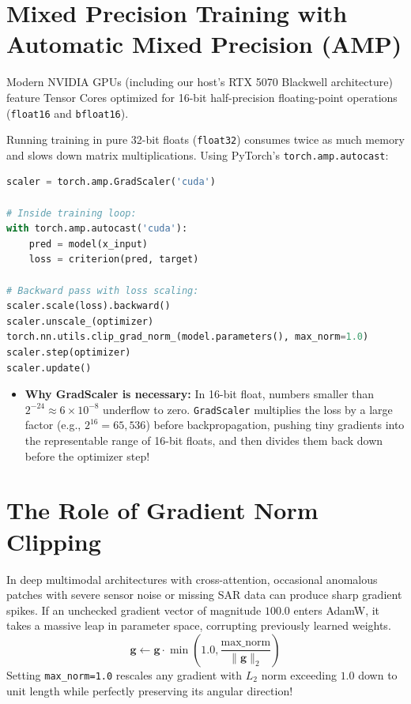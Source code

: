 \section{Mixed Precision Training with Automatic Mixed Precision (AMP)}
Modern NVIDIA GPUs (including our host's RTX 5070 Blackwell architecture) feature Tensor Cores optimized for 16-bit half-precision floating-point operations (\texttt{float16} and \texttt{bfloat16}).

Running training in pure 32-bit floats (\texttt{float32}) consumes twice as much memory and slows down matrix multiplications. Using PyTorch's \texttt{torch.amp.autocast}:
\begin{lstlisting}[language=Python]
scaler = torch.amp.GradScaler('cuda')

# Inside training loop:
with torch.amp.autocast('cuda'):
    pred = model(x_input)
    loss = criterion(pred, target)

# Backward pass with loss scaling:
scaler.scale(loss).backward()
scaler.unscale_(optimizer)
torch.nn.utils.clip_grad_norm_(model.parameters(), max_norm=1.0)
scaler.step(optimizer)
scaler.update()
\end{lstlisting}
\begin{itemize}
    \item \textbf{Why GradScaler is necessary:} In 16-bit float, numbers smaller than $2^{-24} \approx 6 \times 10^{-8}$ underflow to zero. \texttt{GradScaler} multiplies the loss by a large factor (e.g., $2^{16} = 65{,}536$) before backpropagation, pushing tiny gradients into the representable range of 16-bit floats, and then divides them back down before the optimizer step!
\end{itemize}

\section{The Role of Gradient Norm Clipping}
In deep multimodal architectures with cross-attention, occasional anomalous patches with severe sensor noise or missing SAR data can produce sharp gradient spikes. If an unchecked gradient vector of magnitude $100.0$ enters AdamW, it takes a massive leap in parameter space, corrupting previously learned weights.
\begin{equation}
\mathbf{g} \leftarrow \mathbf{g} \cdot \min\left(1.0, \frac{\text{max\_norm}}{\|\mathbf{g}\|_2}\right)
\end{equation}
Setting \texttt{max\_norm=1.0} rescales any gradient with $L_2$ norm exceeding $1.0$ down to unit length while perfectly preserving its angular direction!

